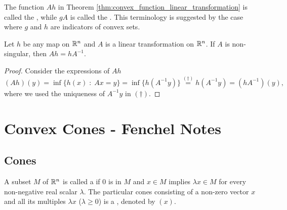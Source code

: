 \documentclass[11pt,a4paper]{article}
\begin{document}
\begin{remark}
    The function $Ah$ in Theorem \ref{thm:convex_function_linear_transformation} is called the , while $gA$ is called the . This terminology is suggested by the case where $g$ and $h$ are indicators of convex sets.
\end{remark}

\begin{proposition}
    Let $h$ be any map on $\mathbb{R}^n$ and $A$ is a linear transformation on $\mathbb{R}^n$. If $A$ is non-singular, then $Ah = hA^{-1}$.
\end{proposition}

\begin{proof}
    Consider the expressions of $Ah$ 
    \begin{equation*}
        (Ah)(y) = \inf\{h(x)\;:\;Ax = y\} = \inf \{h(A^{-1}y)\} \overset{(\dagger)}{=} h(A^{-1}y) = (hA^{-1})(y),
    \end{equation*}
    where we used the uniqueness of $A^{-1}y$ in $(\dagger)$.
\end{proof}

\section*{Convex Cones - Fenchel Notes}

\subsection*{Cones}


\begin{definition}
    A subset $M$ of $\mathbb{R}^n$ is called a  if $0$ is in $M$ and $x\in M$ implies $\lambda x\in M$ for every non-negative real scalar $\lambda$. The particular cones consisting of a non-zero vector $x$ and all its multiples $\lambda x$ ($\lambda \ge 0$) is a , denoted by $(x)$. 
\end{definition}
\end{document}
